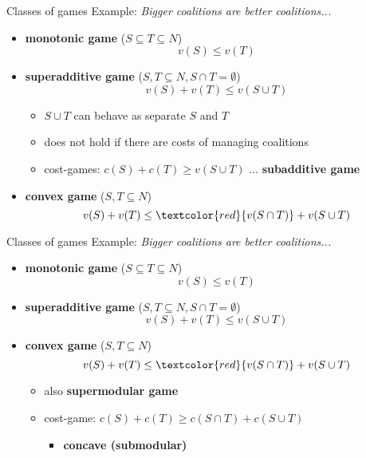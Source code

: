 \documentclass{beamer}
\begin{document}
\begin{frame}{Classes of games}
	Example: \textit{Bigger coalitions are better coalitions...}
	\begin{itemize}
	    \item<2-> \textbf{monotonic game} ($S \subseteq T \subseteq N$) \[v(S) \leq v(T)\]
	    \item<3-> \textbf{superadditive game} ($S,T \subseteq N, S \cap T = \emptyset$) \[v(S) + v(T) \leq v(S \cup T)\]
	    \vspace{-0.3cm}
	    \begin{itemize}
			\item<4-> $S\cup T$ can behave as separate $S$ and $T$
			\item<5-> does not hold if there are costs of managing coalitions
			\item<6-> cost-games: $c(S) + c(T) \geq v(S \cup T)$ ... \textbf{subadditive game}
		\end{itemize}
	    \item<7-> \textbf{convex game} ($S,T \subseteq N$) \[v(S) + v(T) \leq \textcolor{red}{v(S \cap T)} +  v(S \cup T)\]
	\end{itemize}
\end{frame}



\begin{frame}{Classes of games}
    Example: \textit{Bigger coalitions are better coalitions...}
    \begin{itemize}
        \item \textbf{monotonic game} ($S \subseteq T \subseteq N$) \[v(S) \leq v(T)\]
        \item \textbf{superadditive game} ($S,T \subseteq N, S \cap T = \emptyset$) \[v(S) + v(T) \leq v(S \cup T)\]
        \item \textbf{convex game} ($S,T \subseteq N$) \[v(S) + v(T) \leq \textcolor{red}{v(S \cap T)} +  v(S \cup T)\]
    \begin{itemize}
        \item<2-> also \textbf{supermodular game}
        \item<3-> cost-game: $c(S) + c(T) \geq c(S \cap T) + c(S \cup T)$ 
        \begin{itemize}
            \item<3-> \textbf{concave (submodular)}
        \end{itemize}
    \end{itemize}
\end{itemize}
\end{frame}
\end{document}
